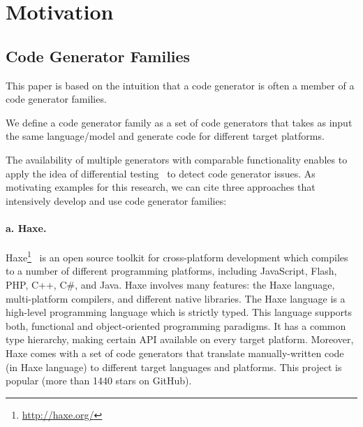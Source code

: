 


\section{Motivation}

\subsection{Code Generator Families}
This paper is based on the intuition that a code generator is often a member of a code generator families.
\begin{mydef}
We define a code generator family as a set of code generators that takes as input the same language/model and generate code for different target platforms.
\end{mydef}
The availability of multiple generators with comparable functionality enables to apply the idea of differential testing~\cite{mckeeman1998differential} to detect code generator issues.
As motivating examples for this research, we can cite three approaches that intensively develop and use code generator families: 
\paragraph{a. Haxe.} 	Haxe\footnote{\url{http://haxe.org/}}~\cite{dasnois2011haxe} is an open source toolkit for cross-platform development which compiles to a number of different programming platforms, including JavaScript, Flash, PHP, C++, C\#, and Java. Haxe involves many features: the Haxe language, multi-platform compilers, and different native libraries. The Haxe language is a high-level programming language which is strictly typed. This language supports both, functional and object-oriented programming paradigms. It has a common type hierarchy, making certain API available on every target platform. Moreover, Haxe comes with a set of code generators that translate manually-written code (in Haxe language) to different target languages and platforms.  
This project is popular (more than \num{1440} stars on GitHub).

